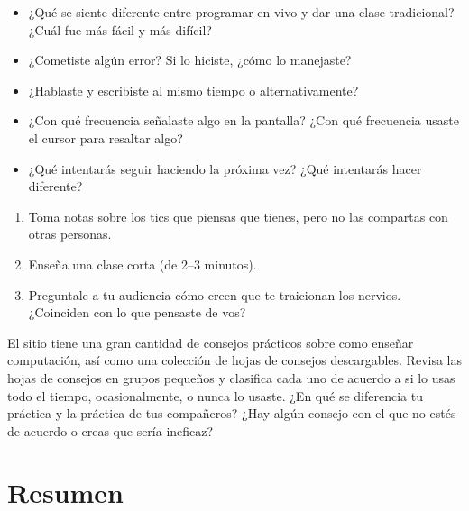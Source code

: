 \begin{itemize}

\item
  ¿Qué se siente diferente entre programar en vivo y dar una clase tradicional?
  ¿Cuál fue más fácil y más difícil?

\item
  ¿Cometiste algún error?
  Si lo hiciste, ¿cómo lo manejaste?

\item
  ¿Hablaste y escribiste al mismo tiempo o alternativamente?

\item
  ¿Con qué frecuencia señalaste algo en la pantalla?
  ¿Con qué frecuencia usaste el cursor para resaltar algo?

\item
  ¿Qué intentarás seguir haciendo la próxima vez?
  ¿Qué intentarás hacer diferente?

\end{itemize}


\begin{enumerate}

\item
  Toma notas sobre los tics que piensas que tienes,
  pero no las compartas con otras personas.

\item
  Enseña una clase corta (de 2--3 minutos).

\item
  Preguntale a tu audiencia cómo creen que te traicionan los nervios.
  ¿Coinciden con lo que pensaste de vos?

\end{enumerate}


El sitio 
tiene una gran cantidad de consejos prácticos sobre como enseñar computación,
así como una colección de hojas de consejos descargables.
Revisa las hojas de consejos en grupos pequeños y clasifica cada uno
de acuerdo a si lo usas todo el tiempo,
ocasionalmente,
o nunca lo usaste.
¿En qué se diferencia tu práctica y la práctica de tus compañeros? 
¿Hay algún consejo con el que no estés de acuerdo o creas que sería ineficaz?

\section*{Resumen}

